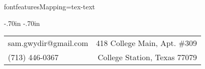fontfeatures{Mapping=tex-text}

\color{black}

\oddsidemargin -.70in
\evensidemargin -.70in
\topmargin -0.45in
\textwidth=6.6in
\itemsep=0in
\parsep=0in

\newenvironment{list1}{
\begin{list}{\ding{113}}{%
  \setlength{\itemsep}{0in}
  \setlength{\parsep}{0in} \setlength{\parskip}{0in}
  \setlength{\topsep}{0in} \setlength{\partopsep}{0in}
  \setlength{\leftmargin}{0.17in}}}{\end{list}}
\newenvironment{list2}{
\begin{list}{$\bullet$}{%
  \setlength{\itemsep}{0in}
  \setlength{\parsep}{0in} \setlength{\parskip}{0in}
  \setlength{\topsep}{0in} \setlength{\partopsep}{0in}
  \setlength{\leftmargin}{0.2in}}}{\end{list}}



\hfill
\vspace*{-.45in}
\begin{tabular}{l r}
sam.gwydir@gmail.com & 418 College Main, Apt. \#309\\
(713) 446-0367 & College Station, Texas 77079
\end{tabular}


